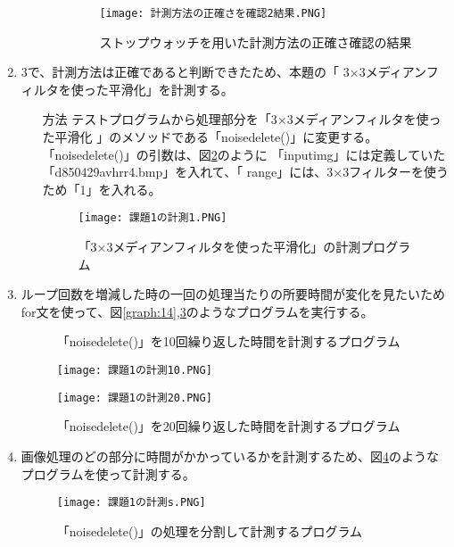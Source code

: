 \begin{enumerate}
\begin{itemize}
\begin{itemize}
\begin{figure}[htbp]
\begin{minipage}[t]{0.45\hsize}
          \centering
          \caption{ストップウォッチを用いた計測方法の正確さ確認の結果}
          \label{graph:8}
          \texttt{[image: 計測方法の正確さを確認2結果.PNG]}
        \end{minipage}
      \end{figure}
    \end{itemize}
  \end{itemize}
\item 3で、計測方法は正確であると判断できたため、本題の「
3×3メディアンフィルタを使った平滑化」を計測する。
\begin{itemize}
  \item[方法] テストプログラムから処理部分を「3×3メディアンフィルタを使った平滑化
  」のメソッドである「noisedelete()」に変更する。
  「noisedelete()」の引数は、図\ref{graph:9}のように
  「inputimg」には定義していた「d850429avhrr4.bmp」を入れて、「
  range」には、3×3フィルターを使うため「1」を入れる。
  \begin{figure}[htbp]
    \begin{minipage}[t]{\hsize}
      \centering
      \caption{「3×3メディアンフィルタを使った平滑化」の計測プログラム}
      \label{graph:9}
      \texttt{[image: 課題1の計測1.PNG]}
    \end{minipage}
  \end{figure}
\end{itemize}
\item ループ回数を増減した時の一回の処理当たりの所要時間が変化を見たいためfor文を使って、図\ref{graph:14},\ref{graph:15}のようなプログラムを実行する。
\begin{figure}[htbp]
  \begin{minipage}[t]{0.45\hsize}
    \centering
    \caption{「noisedelete()」を10回繰り返した時間を計測するプログラム}
    \label{graph:14}
    \texttt{[image: 課題1の計測10.PNG]}
  \end{minipage}
  \begin{minipage}[t]{0.45\hsize}
    \centering
    \caption{「noisedelete()」を20回繰り返した時間を計測するプログラム}
    \label{graph:15}
    \texttt{[image: 課題1の計測20.PNG]}
  \end{minipage}
\end{figure}
\clearpage
\item 画像処理のどの部分に時間がかかっているかを計測するため、図\ref{graph:16}のようなプログラムを使って計測する。
\begin{figure}[htbp]
  \begin{minipage}[t]{\hsize}
    \centering
    \caption{「noisedelete()」の処理を分割して計測するプログラム}
    \label{graph:16}
    \texttt{[image: 課題1の計測s.PNG]}
  \end{minipage}
\end{figure}

\end{enumerate}
\clearpage

